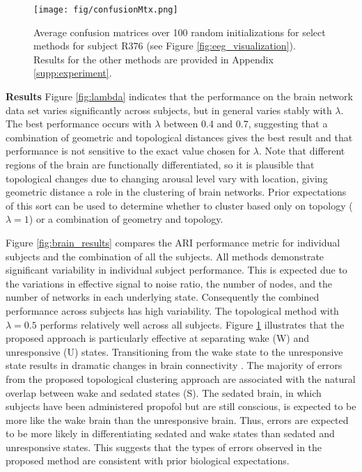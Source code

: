 \documentclass{article} %
\begin{document}
\begin{figure}
\texttt{[image: fig/confusionMtx.png]}
\centering
\caption{Average confusion matrices over 100 random initializations for select methods for subject R376 (see Figure \ref{fig:eeg_visualization}). Results for the other methods are provided in Appendix \ref{supp:experiment}. 
}
\label{fig:confusion_matrix}
\end{figure}


\textbf{Results}
Figure \ref{fig:lambda} indicates that the performance on the brain network data set varies significantly across subjects, but in general varies stably with $\lambda$.  The best performance occurs with $\lambda$ between 0.4 and 0.7, suggesting that a combination of geometric and topological distances gives the best result and that performance is not sensitive to the exact value chosen for $\lambda$. Note that different regions of the brain are functionally differentiated, so it is plausible that topological changes due to changing arousal level vary with location, giving geometric distance a role in the clustering of brain networks.  Prior expectations of this sort can be used to determine whether to cluster based only on topology ($\lambda = 1$) or a combination of geometry and topology.

Figure \ref{fig:brain_results} compares the ARI performance metric for individual subjects and the combination of all the subjects.  All methods demonstrate significant variability in individual subject performance.  This is expected due to the variations in effective signal to noise ratio, the number of nodes, and the number of networks in each underlying state. Consequently the combined performance across subjects has high variability. The topological method with $\lambda = 0.5$ performs relatively well across all subjects. Figure \ref{fig:confusion_matrix} illustrates that the proposed approach is particularly effective at separating wake (W) and unresponsive (U) states.
Transitioning from the wake state to the unresponsive state results in dramatic changes in brain connectivity \citep{banks2020cortical}. The majority of errors from the proposed topological clustering approach are associated with the natural overlap between wake and sedated states (S). The sedated brain, in which subjects have been administered propofol but are still conscious, is expected to be more like the wake brain than the unresponsive brain. Thus, errors are expected to be more likely in differentiating sedated and wake states than sedated and unresponsive states.
This suggests that the types of errors observed in the proposed method are consistent with prior biological expectations.
\end{document}
